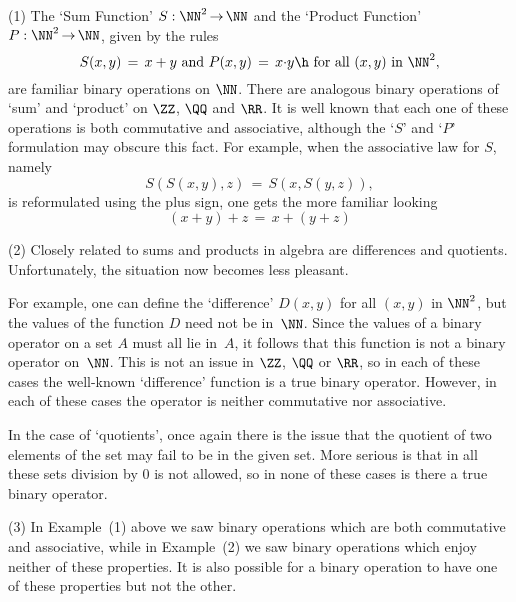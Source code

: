 \hspace*{\parindent} (1) The `Sum Function' $S:{\NN}^{2} \,{\rightarrow}\, {\NN}$ and the `Product Function' $P:{\NN}^{2} \,{\rightarrow}\, {\NN}$,
    given by the rules
        \begin{displaymath}
        S(x,y) \,=\, x+y \mbox{ and } P(x,y) \,=\, x{\cdot}y \h \mbox{ for all $(x,y)$ in ${\NN}^{2}$},
        \end{displaymath}
    are familiar binary operations on ${\NN}$. There are analogous binary operations of `sum' and `product' on ${\ZZ}$, ${\QQ}$ and ${\RR}$.
    It is well known that each one of these operations is both commutative and associative, although the `$S$' and `$P$' formulation may obscure this fact.
    For example, when the associative law for $S$, namely
        \begin{displaymath}
        S(S(x,y),z) \,=\, S(x,S(y,z)),
        \end{displaymath}
    is reformulated using the plus sign, one gets the more familiar looking
        \begin{displaymath}
        (x+y) + z \,=\, x + (y+z)
        \end{displaymath}

\V

       (2) Closely related to sums and products in algebra are differences and quotients. Unfortunately, the situation now becomes less pleasant.

        For example, one can define the `difference' $D(x,y)$ for all $(x,y)$ in ${\NN}^{2}$, but the values of the function $D$ need not be in~${\NN}$.
    Since the values of a binary operator on a set $A$ must all lie in~$A$, it follows that this function is not a binary operator on~${\NN}$.
    This is not an issue in ${\ZZ}$, ${\QQ}$ or ${\RR}$, so in each of these cases the well-known `difference' function is a true binary operator.
    However, in each of these cases the operator is neither commutative nor associative.

        In the case of `quotients', once again there is the issue that the quotient of two elements of the set may fail to be in the given set.
    More serious is that in all these sets division by $0$ is not allowed, so in none of these cases is there a true binary operator.

\V

       (3) In Example~(1) above we saw binary operations which are both commutative and associative,
    while in Example~(2) we saw binary operations which enjoy neither of these properties.
    It is also possible for a binary operation to have one of these properties but not the other.

